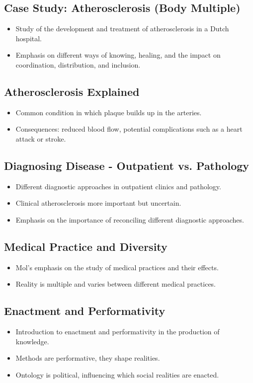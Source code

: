\documentclass{article}
\begin{document}
\subsection*{Case Study: Atherosclerosis (Body Multiple)}
\begin{itemize}
    \item Study of the development and treatment of atherosclerosis in a Dutch hospital.
    \item Emphasis on different ways of knowing, healing, and the impact on coordination, distribution, and inclusion.
\end{itemize}

\subsection*{Atherosclerosis Explained}
\begin{itemize}
    \item Common condition in which plaque builds up in the arteries.
    \item Consequences: reduced blood flow, potential complications such as a heart attack or stroke.
\end{itemize}

\subsection*{Diagnosing Disease - Outpatient vs. Pathology}
\begin{itemize}
    \item Different diagnostic approaches in outpatient clinics and pathology.
    \item Clinical atherosclerosis more important but uncertain.
    \item Emphasis on the importance of reconciling different diagnostic approaches.
\end{itemize}

\subsection*{Medical Practice and Diversity}
\begin{itemize}
    \item Mol's emphasis on the study of medical practices and their effects.
    \item Reality is multiple and varies between different medical practices.
\end{itemize}

\subsection*{Enactment and Performativity}
\begin{itemize}
    \item Introduction to enactment and performativity in the production of knowledge.
    \item Methods are performative, they shape realities.
    \item Ontology is political, influencing which social realities are enacted.
\end{itemize}
\end{document}
